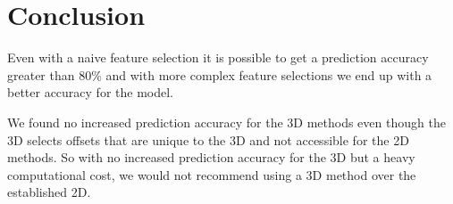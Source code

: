 \chapter{Conclusion}

Even with a naive feature selection it is possible to get a prediction accuracy greater than 80\% and with more complex feature selections we end up with a better accuracy for the model.

We found no increased prediction accuracy for the 3D methods even though the 3D selects offsets that are unique to the 3D and not accessible for the 2D methods. So with no increased prediction accuracy for the 3D but a heavy computational cost, we would not recommend using a 3D method over the established 2D.





